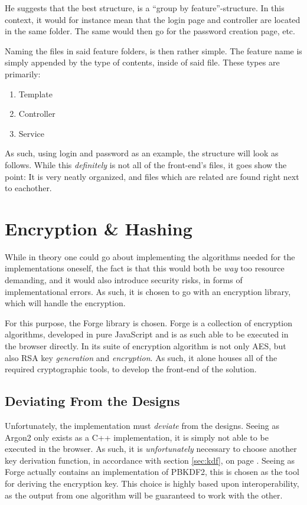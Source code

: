 		He suggests that the best structure, is a ``group by feature''-structure. In this context, it would for instance mean that the login page and controller are located in the same folder. The same would then go for the password creation page, etc.

		Naming the files in said feature folders, is then rather simple. The feature name is simply appended by the type of contents, inside of said file. These types are primarily:
		\begin{enumerate}
			\item Template
			\item Controller
			\item Service
		\end{enumerate}
		As such, using login and password as an example, the structure will look as follows. While this \emph{definitely} is not all of the front-end's files, it goes show the point: It is very neatly organized, and files which are related are found right next to eachother.


	\section{Encryption \& Hashing}
		While in theory one could go about implementing the algorithms needed for the implementations oneself, the fact is that this would both be \emph{way} too resource demanding, and it would also introduce security risks, in forms of implementational errors. As such, it is chosen to go with an encryption library, which will handle the encryption.

		For this purpose, the Forge library is chosen\cite{forge-encryption}. Forge is a collection of encryption algorithms, developed in pure JavaScript and is as such able to be executed in the browser directly. In its suite of encryption algorithm is not only AES, but also RSA key \emph{generation} and \emph{encryption}. As such, it alone houses all of the required cryptographic tools, to develop the front-end of the solution.

		\subsection{Deviating From the Designs}
			Unfortunately, the implementation must \emph{deviate} from the designs. Seeing as Argon2 only exists as a C++ implementation, it is simply not able to be executed in the browser. As such, it is \emph{unfortunately} necessary to choose another key derivation function, in accordance with section \ref{sec:kdf}, on page \pageref{sec:kdf}. Seeing as Forge actually contains an implementation of PBKDF2, this is chosen as the tool for deriving the encryption key. This choice is highly based upon interoperability, as the output from one algorithm will be guaranteed to work with the other.

